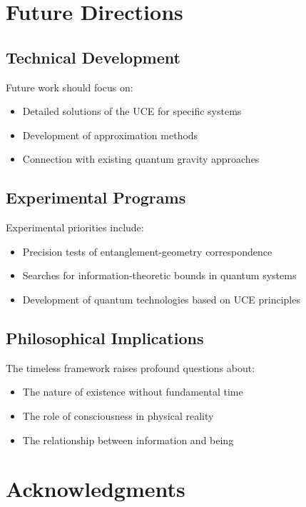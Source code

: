 \documentclass[12pt,a4paper]{article}
\begin{document}
\section{Future Directions}

\subsection{Technical Development}

Future work should focus on:
\begin{itemize}
\item Detailed solutions of the UCE for specific systems
\item Development of approximation methods
\item Connection with existing quantum gravity approaches
\end{itemize}

\subsection{Experimental Programs}

Experimental priorities include:
\begin{itemize}
\item Precision tests of entanglement-geometry correspondence
\item Searches for information-theoretic bounds in quantum systems
\item Development of quantum technologies based on UCE principles
\end{itemize}

\subsection{Philosophical Implications}

The timeless framework raises profound questions about:
\begin{itemize}
\item The nature of existence without fundamental time
\item The role of consciousness in physical reality
\item The relationship between information and being
\end{itemize}

\section*{Acknowledgments}
\end{document}

